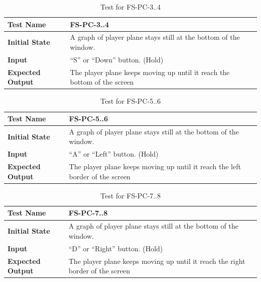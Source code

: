 \documentclass[12,english]{article}
\begin{document}
		\begin{table}[!htbp]
			
			\begin{tabularx}{\textwidth}{|l|X|}
				
				\hline
				
				\textbf{Test Name} & FS-PC-3..4
				\\ 
				\hline
				\textbf{Initial State} & A graph of player plane stays still at the bottom of the window. \\ 
				\hline
				\textbf{Input} & “S” or “Down” button. (Hold)  \\ 
				\hline 
				\textbf{Expected Output} & The player plane keeps moving up until it reach the bottom of the screen \\ 
				\hline
				
			\end{tabularx}
			\caption{Test for FS-PC-3..4}
			\label{Table}
		\end{table}
				\begin{table}[!htbp]
			
			\begin{tabularx}{\textwidth}{|l|X|}
				
				\hline
				
				\textbf{Test Name} & FS-PC-5..6
				\\ 
				\hline
				\textbf{Initial State} & A graph of player plane stays still at the bottom of the window. \\ 
				\hline
				\textbf{Input} & “A” or “Left” button. (Hold)  \\ 
				\hline 
				\textbf{Expected Output} & The player plane keeps moving up until it reach the left border of the screen \\ 
				\hline
				
			\end{tabularx}
			\caption{Test for FS-PC-5..6}
			\label{Table}
		\end{table}
				\begin{table}[!htbp]
			
			\begin{tabularx}{\textwidth}{|l|X|}
				
				\hline
				
				\textbf{Test Name} & FS-PC-7..8
				\\ 
				\hline
				\textbf{Initial State} & A graph of player plane stays still at the bottom of the window. \\ 
				\hline
				\textbf{Input} & “D” or “Right” button. (Hold)  \\ 
				\hline 
				\textbf{Expected Output} & The player plane keeps moving up until it reach the right border of the screen \\ 
				\hline
				
			\end{tabularx}
			\caption{Test for FS-PC-7..8}
			\label{Table}
		\end{table}
\end{document}
